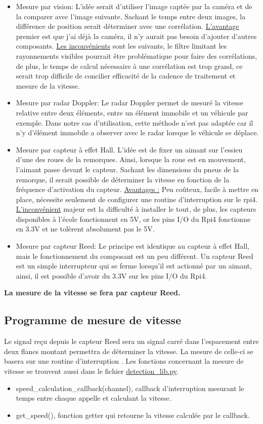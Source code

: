 \begin{itemize}
    \item Mesure par vision: L'idée serait d'utiliser l'image captée par la caméra et de la comparer avec l'image suivante. Sachant le temps entre deux images,
          la différence de position serait déterminer avec une corrélation. \underline{L'avantage} premier est que j'ai déjà la caméra, il n'y aurait pas besoin d'ajouter d'autres composants.
          \underline{Les inconvénients} sont les suivants, le filtre limitant les rayonnements visibles pourrait être problématique pour faire des corrélations, de plus, le temps de calcul nécessaire
          à une corrélation est trop grand, ce serait trop difficile de concilier efficacité de la cadence de traitement et mesure de la vitesse.
    \item Mesure par radar Doppler: Le radar Doppler permet de mesuré la vitesse relative entre deux éléments, entre un élément immobile et un véhicule par exemple. Dans notre cas d'utilisation, cette méthode n'est pas adaptée car il n'y
          d'élément immobile a observer avec le radar lorsque le véhicule se déplace.
    \item Mesure par capteur à effet Hall. L'idée est de fixer un aimant sur l'essieu d'une des roues de la remorques.
          Ainsi, lorsque la roue est en mouvement, l'aimant passe devant le capteur. Sachant les dimensions du pneus de la remorque, il serait possible de déterminer la vitesse en fonction de la fréquence d'activation du capteur.
          \underline{Avantages :} Peu coûteux, facile à mettre en place, nécessite seulement de configurer une routine d'interruption sur le \Gls{rpi4}.
          \underline{L'inconvénient} majeur est la difficulté à installer le tout, de plus, les capteurs disponibles à l'école fonctionnent en 5V, or les pins I/O du Rpi4 fonctionne en 3.3V et ne tolèrent absolument pas le 5V.
    \item Mesure par capteur Reed: Le principe est identique au capteur à effet Hall, mais le fonctionnement du composant est un peu différent. Un capteur Reed est un simple interrupteur qui se ferme lorsqu'il est actionné par un aimant,
          ainsi, il est possible d'avoir du 3.3V sur les pins I/O du Rpi4.
\end{itemize}
\textbf{La mesure de la vitesse se fera par capteur Reed.}
\subsection{Programme de mesure de vitesse}
Le signal reçu depuis le capteur Reed sera un signal carré dans l'espacement entre deux flancs montant permettra de déterminer la vitesse. La mesure de celle-ci
se basera sur une routine d'interruption \cite{ed_raspberry_2020}. Les fonctions concernant la mesure de vitesse se trouvent aussi dans le fichier \underline{detection\_lib.py}.
\begin{itemize}
    \item speed\_calculation\_callback(channel), callback d'interruption mesurant le temps entre chaque appelle et calculant la vitesse.
    \item get\_speed(), fonction getter qui retourne la vitesse calculée par le callback.
\end{itemize}



